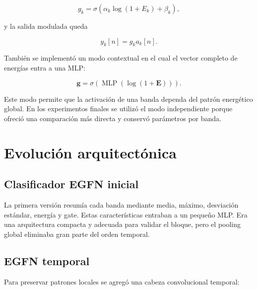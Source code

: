 \documentclass[11pt,a4paper]{article}
\begin{document}
\begin{equation}
g_k = \sigma\!\left(\alpha_k \log(1+E_k)+\beta_k\right),
\end{equation}

y la salida modulada queda

\begin{equation}
y_k[n] = g_k a_k[n].
\end{equation}

También se implementó un modo contextual en el cual el vector completo de
energías entra a una MLP:

\begin{equation}
\mathbf{g}=\sigma\!\left(\operatorname{MLP}
(\log(1+\mathbf{E}))\right).
\end{equation}

Este modo permite que la activación de una banda dependa del patrón energético
global. En los experimentos finales se utilizó el modo independiente porque
ofreció una comparación más directa y conservó parámetros por banda.

\section{Evolución arquitectónica}

\subsection{Clasificador EGFN inicial}

La primera versión resumía cada banda mediante media, máximo, desviación
estándar, energía y gate. Estas características entraban a un pequeño MLP. Era
una arquitectura compacta y adecuada para validar el bloque, pero el pooling
global eliminaba gran parte del orden temporal.

\subsection{EGFN temporal}

Para preservar patrones locales se agregó una cabeza convolucional temporal:
\end{document}
